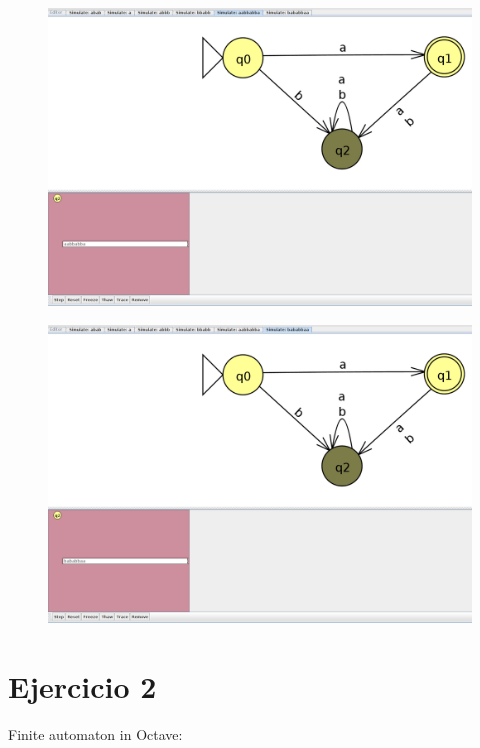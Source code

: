 \documentclass[11pt]{article}
\begin{document}
\begin{figure}[]
\centering
\includegraphics[scale=0.2]{images/Cadena5.png}
\label{}
\\
\end{figure}

\begin{figure}[]
\centering
\includegraphics[scale=0.2]{images/Cadena6.png}
\label{}
\\
\end{figure}

\newpage
\section*{Ejercicio 2}
Finite automaton in Octave:
\end{document}
